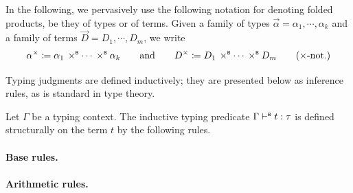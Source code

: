 In the following, we pervasively use the following notation for denoting folded products, be they of types or of terms.
Given a family of types \(\vec\alpha = \alpha_1, \cdots, \alpha_k\) and a family of terms \(\vec D = D_1, \cdots, D_m\), we write
\begin{equation}
  \alpha^\times \coloneq \alpha_1 \mathbin{\,\times^{\scriptscriptstyle{\mathsf{B}}}} \cdots \mathbin{\,\times^{\scriptscriptstyle{\mathsf{B}}}} \alpha_k \qquad\text{and}\qquad
  D^\times \coloneq D_1 \mathbin{\,\times^{\scriptscriptstyle{\mathsf{B}}}} \cdots \mathbin{\,\times^{\scriptscriptstyle{\mathsf{B}}}} D_m \tag{\(\times\)-not.} \label{eq:prod-notation}
\end{equation}

Typing judgments are defined inductively; they are presented below as inference
rules, as is standard in type theory.
\begin{definition}
\label{def:b-concrete-typing}
  Let \(\Gamma\) be a typing context. The inductive typing predicate \(\Gamma \vdash^{\scriptscriptstyle{\mathsf{B}}} t : \tau\) is defined structurally on the term \(t\) by the following rules.
\paragraph{Base rules.}
\paragraph{Arithmetic rules.}

\end{definition}
